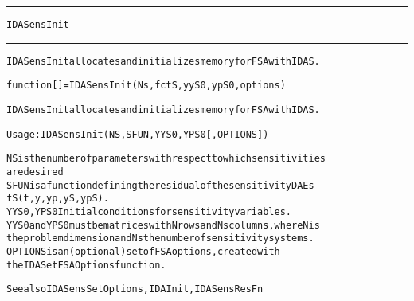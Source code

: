 \begin{samepage}
\hrule
\begin{center}
{\large \verb!IDASensInit!}
\label{p:IDASensInit}
\end{center}
\hrule\vspace{0.1in}



\begin{alltt}
IDASensInit allocates and initializes memory for FSA with IDAS.
\end{alltt}

\end{samepage}



\begin{samepage}


\begin{alltt}
function [] = IDASensInit(Ns,fctS,yyS0,ypS0,options) 
\end{alltt}

\end{samepage}



\begin{alltt}
IDASensInit allocates and initializes memory for FSA with IDAS.

   Usage: IDASensInit ( NS, SFUN, YYS0, YPS0 [, OPTIONS ] ) 

   NS       is the number of parameters with respect to which sensitivities
            are desired
   SFUN     is a function defining the residual of the sensitivity DAEs
            fS(t,y,yp,yS,ypS).
   YYS0, YPS0   Initial conditions for sensitivity variables.
            YYS0 and YPS0 must be matrices with N rows and Ns columns, where N is 
            the problem dimension and Ns the number of sensitivity systems.
   OPTIONS  is an (optional) set of FSA options, created with
            the IDASetFSAOptions function. 

   See also IDASensSetOptions, IDAInit, IDASensResFn
\end{alltt}






\vspace{0.1in}